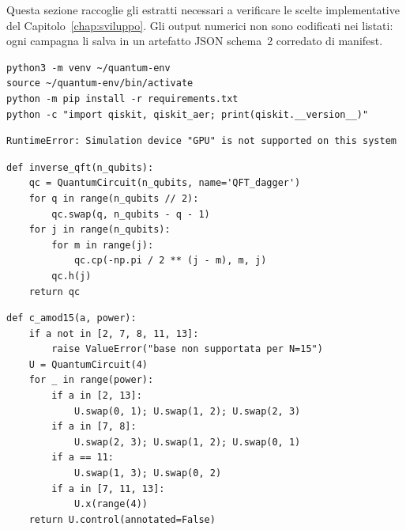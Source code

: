
Questa sezione raccoglie gli estratti necessari a verificare le scelte implementative del Capitolo~\ref{chap:sviluppo}. Gli output numerici non sono codificati nei listati: ogni campagna li salva in un artefatto JSON schema~2 corredato di manifest.

\begin{lstlisting}[caption={Installazione dell'ambiente Python e delle librerie necessarie}, label={lst:installazione_dellambiente_python_e}]
python3 -m venv ~/quantum-env
source ~/quantum-env/bin/activate
python -m pip install -r requirements.txt
python -c "import qiskit, qiskit_aer; print(qiskit.__version__)"
\end{lstlisting}

\begin{lstlisting}[caption={Errore GPU osservato su WSL durante i test}, label={lst:errore_gpu_su_wsl}]
RuntimeError: Simulation device "GPU" is not supported on this system
\end{lstlisting}

\begin{lstlisting}[caption={Implementazione della Quantum Fourier Transform inversa}, label={lst:implementazione_della_quantum_fourier}]
def inverse_qft(n_qubits):
    qc = QuantumCircuit(n_qubits, name='QFT_dagger')
    for q in range(n_qubits // 2):
        qc.swap(q, n_qubits - q - 1)
    for j in range(n_qubits):
        for m in range(j):
            qc.cp(-np.pi / 2 ** (j - m), m, j)
        qc.h(j)
    return qc
\end{lstlisting}

\begin{lstlisting}[caption={Moltiplicazione modulare N15 corretta: l'operazione $\times a$ viene ripetuta \texttt{power} volte}, label={lst:modular_exponentiation_per_n15}]
def c_amod15(a, power):
    if a not in [2, 7, 8, 11, 13]:
        raise ValueError("base non supportata per N=15")
    U = QuantumCircuit(4)
    for _ in range(power):
        if a in [2, 13]:
            U.swap(0, 1); U.swap(1, 2); U.swap(2, 3)
        if a in [7, 8]:
            U.swap(2, 3); U.swap(1, 2); U.swap(0, 1)
        if a == 11:
            U.swap(1, 3); U.swap(0, 2)
        if a in [7, 11, 13]:
            U.x(range(4))
    return U.control(annotated=False)
\end{lstlisting}

